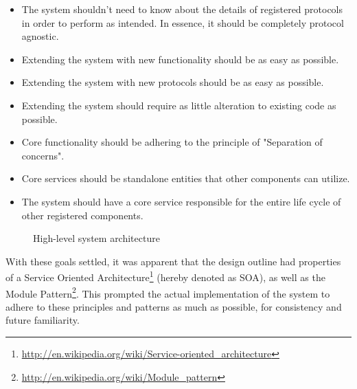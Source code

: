 \begin{itemize}
\item The system shouldn't need to know about the details of registered protocols in order to perform as intended. In essence, it should be completely protocol agnostic.
\item Extending the system with new functionality should be as easy as possible.
\item Extending the system with new protocols should be as easy as possible.
\item Extending the system should require as little alteration to existing code as possible.
\item Core functionality should be adhering to the principle of "Separation of concerns".
\item Core services should be standalone entities that other components can utilize.
\item The system should have a core service responsible for the entire life cycle of other registered components.
\end{itemize}

\begin{center}
  \begin{figure}[ht!]
    \caption{High-level system architecture}
    \label{fig:abstract_architecture}
  \end{figure}
\end{center}

With these goals settled, it was apparent that the design outline had properties of a Service Oriented Architecture\footnote{\url{http://en.wikipedia.org/wiki/Service-oriented_architecture}} (hereby denoted as SOA), as well as the Module Pattern\footnote{\url{http://en.wikipedia.org/wiki/Module_pattern}}. This prompted the actual implementation of the system to adhere to these principles and patterns as much as possible, for consistency and future familiarity.


